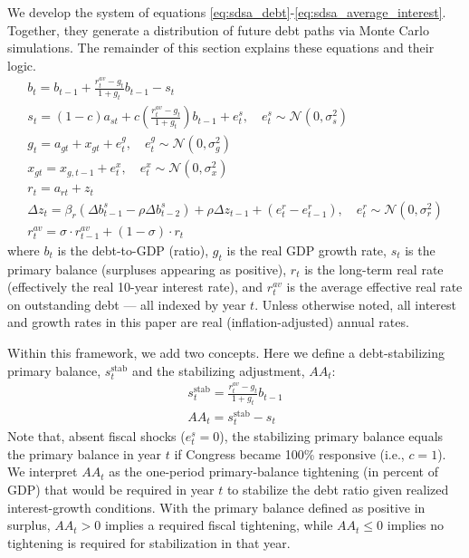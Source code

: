 \documentclass[12pt]{article}
\begin{document}
We develop the system of equations \ref{eq:sdsa_debt}-\ref{eq:sdsa_average_interest}. Together, they generate a distribution of future debt paths via Monte Carlo simulations. The remainder of this section explains these equations and their logic.
\begin{gather}
	    b_t = b_{t-1} + \frac{r_t^{av} - g_t}{1 + g_t} b_{t-1} - s_t
        \label{eq:sdsa_debt} \\
        s_t = (1 - c)a_{st} + c\left(\frac{r_t^{av} - g_t}{1 + g_t}\right) b_{t-1} + e_t^s,\quad e_t^s \sim \mathcal{N}(0, \sigma^2_s)
        \label{eq:sdsa_deficit} \\
        g_t = a_{gt} + x_{gt} + e^g_t,\quad e^g_t \sim \mathcal{N}(0, \sigma^2_g)
        \label{eq:sdsa_growth} \\
        x_{gt} = x_{g,t-1} + e^x_t,\quad e^x_t \sim \mathcal{N}(0, \sigma^2_x)
        \label{eq:sdsa_growth_persistent} \\
        r_t = a_{rt} + z_t
        \label{eq:sdsa_interest} \\
        \Delta z_t = \beta_r (\Delta b^s_{t-1} - \rho \Delta b^s_{t-2}) + \rho \Delta z_{t-1} + (e^r_t - e^r_{t-1}),\quad e^r_t \sim \mathcal{N}(0, \sigma^2_r)
        \label{eq:sdsa_interest_deviations} \\
        r_t^{av} = \sigma \cdot r^{av}_{t-1} + (1 - \sigma) \cdot r_t
        \label{eq:sdsa_average_interest} 
\end{gather}
where $b_t$ is the debt-to-GDP (ratio), $g_t$ is the real GDP growth rate, $s_t$ is the primary balance (surpluses appearing as positive), $r_t$ is the long-term real rate (effectively the real 10-year interest rate), and $r^{av}_t$ is the average effective real rate on outstanding debt --- all indexed by year $t$. Unless otherwise noted, all interest and growth rates in this paper are real (inflation-adjusted) annual rates.

Within this framework, we add two concepts. Here we define a debt-stabilizing primary balance, $s^{\text{stab}}_t$ and the stabilizing adjustment, $AA_t$:
\begin{gather}
    s^{\text{stab}}_t = \frac{r_t^{av} - g_t}{1 + g_t} b_{t-1} 
    \label{eq:stab_balance} \\
    AA_t = s^{\text{stab}}_t - s_t
    \label{eq:adjustment}
\end{gather} 
Note that, absent fiscal shocks ($e_t^s = 0$), the stabilizing primary balance equals the primary balance in year $t$ if Congress became 100\% responsive (i.e., $c=1$). We interpret $AA_t$ as the one-period primary-balance tightening (in percent of GDP) that would be required in year $t$ to stabilize the debt ratio given realized interest-growth conditions. With the primary balance defined as positive in surplus, $AA_t>0$ implies a required fiscal tightening, while $AA_t \leq 0$ implies no tightening is required for stabilization in that year.
\end{document}
